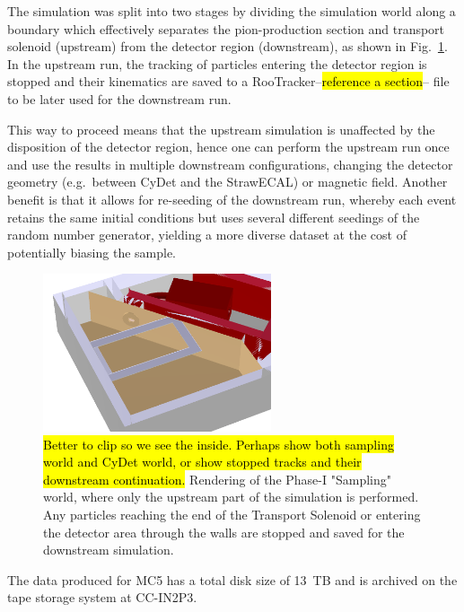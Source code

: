 The simulation was split into two stages by dividing the simulation world along a boundary which effectively separates the pion-production section and transport solenoid (upstream) from the detector region (downstream), as shown in Fig.~\ref{fig:Phase-I Sampling World}. In the upstream run, the tracking of particles entering the detector region is stopped and their kinematics are saved to a RooTracker--\hl{reference a section}-- file to be later used for the downstream run. 

This way to proceed means that the upstream simulation is unaffected by the disposition of the detector region, hence one can perform the upstream run once and use the results in multiple downstream configurations, changing the detector geometry (e.g.\ between CyDet and the StrawECAL) or magnetic field. 
Another benefit is that it allows for re-seeding of the downstream run, whereby each event retains the same initial conditions but uses several different seedings of the random number generator, yielding a more diverse dataset at the cost of potentially biasing the sample.

\begin{figure}
    \centering
    \includegraphics[width=0.6\textwidth]{chapter3/Phase-I-Sampling-World.png}
    
    \caption{\hl{Better to clip so we see the inside. Perhaps show both sampling world and CyDet world, or show stopped tracks and their downstream continuation.} Rendering of the Phase-I "Sampling" world, where only the upstream part of the simulation is performed. Any particles reaching the end of the Transport Solenoid or entering the detector area through the walls are stopped and saved for the downstream simulation.}
    \label{fig:Phase-I Sampling World}
\end{figure}

The data produced for MC5 has a total disk size of \SI{13}{TB} and is archived on the tape storage system at CC-IN2P3.


